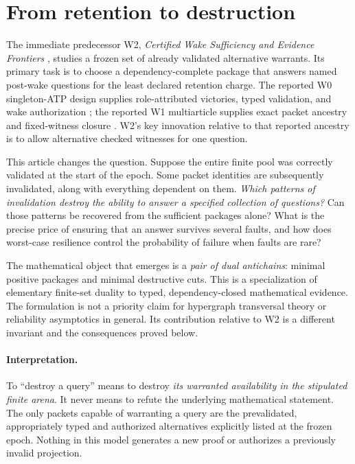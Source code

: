 \documentclass[11pt,letterpaper]{article}
\begin{document}
\section{From retention to destruction}\label{gl-first-W3-s1}
The immediate predecessor W2, \emph{Certified Wake Sufficiency and Evidence Frontiers} \cite{W2}, studies a frozen set of already validated alternative warrants. Its primary task is to choose a dependency-complete package that answers named post-wake questions for the least declared retention charge. The reported W0 singleton-ATP design supplies role-attributed victories, typed validation, and wake authorization \cite{W0}; the reported W1 multiarticle supplies exact packet ancestry and fixed-witness closure \cite{W1}. W2's key innovation relative to that reported ancestry is to allow alternative checked witnesses for one question.

This article changes the question. Suppose the entire finite pool was correctly validated at the start of the epoch. Some packet identities are subsequently invalidated, along with everything dependent on them. \emph{Which patterns of invalidation destroy the ability to answer a specified collection of questions?} Can those patterns be recovered from the sufficient packages alone? What is the precise price of ensuring that an answer survives several faults, and how does worst-case resilience control the probability of failure when faults are rare?

The mathematical object that emerges is a \emph{pair of dual antichains}: minimal positive packages and minimal destructive cuts. This is a specialization of elementary finite-set duality to typed, dependency-closed mathematical evidence. The formulation is not a priority claim for hypergraph transversal theory or reliability asymptotics in general. Its contribution relative to W2 is a different invariant and the consequences proved below.

\paragraph{Interpretation.} To ``destroy a query'' means to destroy \emph{its warranted availability in the stipulated finite arena}. It never means to refute the underlying mathematical statement. The only packets capable of warranting a query are the prevalidated, appropriately typed and authorized alternatives explicitly listed at the frozen epoch. Nothing in this model generates a new proof or authorizes a previously invalid projection.
\end{document}
